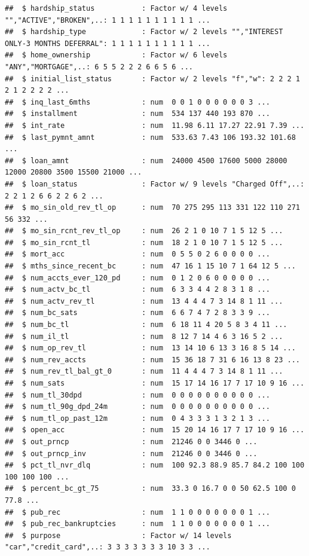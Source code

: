 \documentclass[]{article}
\begin{document}
\begin{verbatim}
##  $ hardship_status           : Factor w/ 4 levels "","ACTIVE","BROKEN",..: 1 1 1 1 1 1 1 1 1 1 ...
##  $ hardship_type             : Factor w/ 2 levels "","INTEREST ONLY-3 MONTHS DEFERRAL": 1 1 1 1 1 1 1 1 1 1 ...
##  $ home_ownership            : Factor w/ 6 levels "ANY","MORTGAGE",..: 6 5 5 2 2 2 6 6 5 6 ...
##  $ initial_list_status       : Factor w/ 2 levels "f","w": 2 2 2 1 2 1 2 2 2 2 ...
##  $ inq_last_6mths            : num  0 0 1 0 0 0 0 0 0 3 ...
##  $ installment               : num  534 137 440 193 870 ...
##  $ int_rate                  : num  11.98 6.11 17.27 22.91 7.39 ...
##  $ last_pymnt_amnt           : num  533.63 7.43 106 193.32 101.68 ...
##  $ loan_amnt                 : num  24000 4500 17600 5000 28000 12000 20800 3500 15500 21000 ...
##  $ loan_status               : Factor w/ 9 levels "Charged Off",..: 2 2 1 2 6 6 2 2 6 2 ...
##  $ mo_sin_old_rev_tl_op      : num  70 275 295 113 331 122 110 271 56 332 ...
##  $ mo_sin_rcnt_rev_tl_op     : num  26 2 1 0 10 7 1 5 12 5 ...
##  $ mo_sin_rcnt_tl            : num  18 2 1 0 10 7 1 5 12 5 ...
##  $ mort_acc                  : num  0 5 5 0 2 6 0 0 0 0 ...
##  $ mths_since_recent_bc      : num  47 16 1 15 10 7 1 64 12 5 ...
##  $ num_accts_ever_120_pd     : num  0 1 2 0 6 0 0 0 0 0 ...
##  $ num_actv_bc_tl            : num  6 3 3 4 4 2 8 3 1 8 ...
##  $ num_actv_rev_tl           : num  13 4 4 4 7 3 14 8 1 11 ...
##  $ num_bc_sats               : num  6 6 7 4 7 2 8 3 3 9 ...
##  $ num_bc_tl                 : num  6 18 11 4 20 5 8 3 4 11 ...
##  $ num_il_tl                 : num  8 12 7 14 4 6 3 16 5 2 ...
##  $ num_op_rev_tl             : num  13 14 10 6 13 3 16 8 5 14 ...
##  $ num_rev_accts             : num  15 36 18 7 31 6 16 13 8 23 ...
##  $ num_rev_tl_bal_gt_0       : num  11 4 4 4 7 3 14 8 1 11 ...
##  $ num_sats                  : num  15 17 14 16 17 7 17 10 9 16 ...
##  $ num_tl_30dpd              : num  0 0 0 0 0 0 0 0 0 0 ...
##  $ num_tl_90g_dpd_24m        : num  0 0 0 0 0 0 0 0 0 0 ...
##  $ num_tl_op_past_12m        : num  0 4 3 3 3 1 3 2 1 3 ...
##  $ open_acc                  : num  15 20 14 16 17 7 17 10 9 16 ...
##  $ out_prncp                 : num  21246 0 0 3446 0 ...
##  $ out_prncp_inv             : num  21246 0 0 3446 0 ...
##  $ pct_tl_nvr_dlq            : num  100 92.3 88.9 85.7 84.2 100 100 100 100 100 ...
##  $ percent_bc_gt_75          : num  33.3 0 16.7 0 0 50 62.5 100 0 77.8 ...
##  $ pub_rec                   : num  1 1 0 0 0 0 0 0 0 1 ...
##  $ pub_rec_bankruptcies      : num  1 1 0 0 0 0 0 0 0 1 ...
##  $ purpose                   : Factor w/ 14 levels "car","credit_card",..: 3 3 3 3 3 3 3 10 3 3 ...

\end{verbatim}
\end{document}
